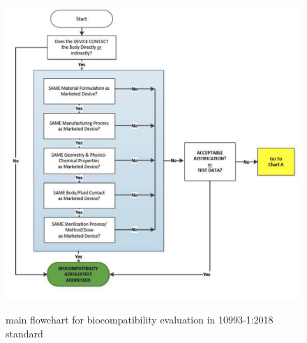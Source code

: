 \documentclass{Configuration_Files/PoliMi3i_thesis}
\begin{document}
\begin{figure}[H]
	\includegraphics[scale=0.25]{figure1_fda.png}
	\centering
    \label{fda_1}
    \caption{main flowchart for biocompatibility evaluation in 10993-1:2018 standard \cite{healthUseInternationalStandard2023}}
\end{figure}
\end{document}
